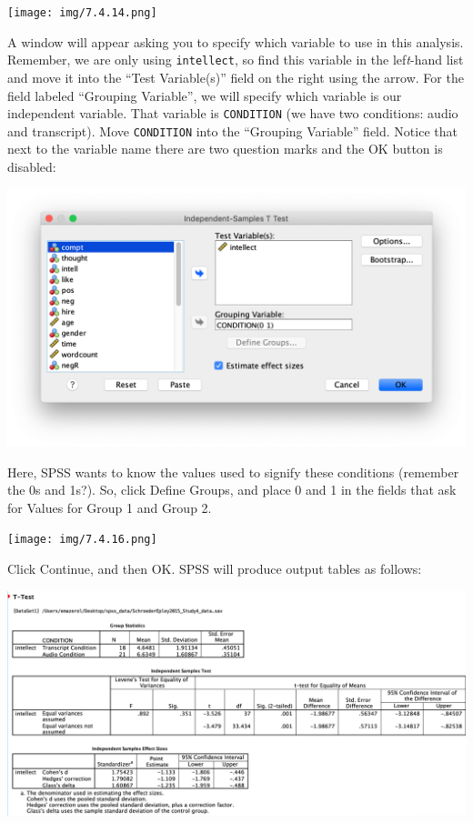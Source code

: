 \documentclass[
]{book}
\begin{document}
\texttt{[image: img/7.4.14.png]}

A window will appear asking you to specify which variable to use in this analysis. Remember, we are only using \texttt{intellect}, so find this variable in the lef\emph{t}-hand list and move it into the ``Test Variable(s)'' field on the right using the arrow. For the field labeled ``Grouping Variable'', we will specify which variable is our independent variable. That variable is \texttt{CONDITION} (we have two conditions: audio and transcript). Move \texttt{CONDITION} into the ``Grouping Variable'' field. Notice that next to the variable name there are two question marks and the OK button is disabled:

\includegraphics{img/7.4.15.png}

Here, SPSS wants to know the values used to signify these conditions (remember the 0s and 1s?). So, click {Define Groups}, and place 0 and 1 in the fields that ask for Values for Group 1 and Group 2.

\texttt{[image: img/7.4.16.png]}

Click {Continue}, and then {OK}. SPSS will produce output tables as follows:

\includegraphics{img/7.4.17.png}
\end{document}
